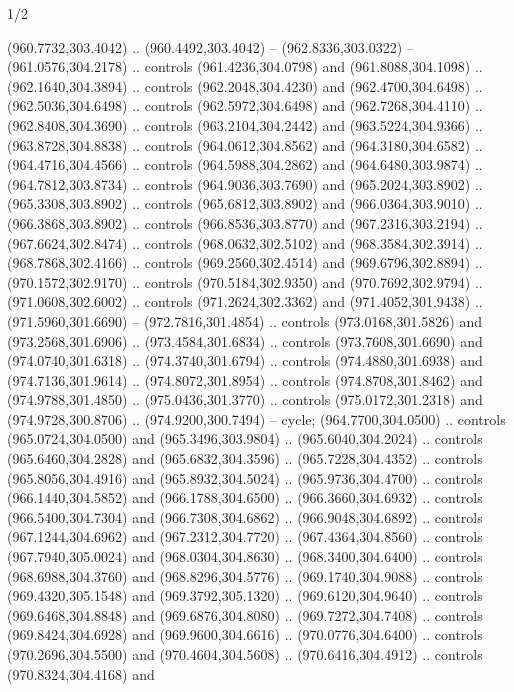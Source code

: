 \begin{flagdescription}{1/2}
\begin{scope}[xshift=0.75\flaglength,yshift=0.5\flagwidth,scale=0.00293\flagwidth]
\begin{scope}[scale=0.675,y=0.80pt, x=0.80pt,yscale=-1,xshift=-720,yshift=-240]
\begin{scope}[miter limit=4.80]
\begin{scope}[draw=black,fill=brown,line width=0.336\lw]
  (960.7732,303.4042) .. (960.4492,303.4042) -- (962.8336,303.0322) --
  (961.0576,304.2178) .. controls (961.4236,304.0798) and (961.8088,304.1098) ..
  (962.1640,304.3894) .. controls (962.2048,304.4230) and (962.4700,304.6498) ..
  (962.5036,304.6498) .. controls (962.5972,304.6498) and (962.7268,304.4110) ..
  (962.8408,304.3690) .. controls (963.2104,304.2442) and (963.5224,304.9366) ..
  (963.8728,304.8838) .. controls (964.0612,304.8562) and (964.3180,304.6582) ..
  (964.4716,304.4566) .. controls (964.5988,304.2862) and (964.6480,303.9874) ..
  (964.7812,303.8734) .. controls (964.9036,303.7690) and (965.2024,303.8902) ..
  (965.3308,303.8902) .. controls (965.6812,303.8902) and (966.0364,303.9010) ..
  (966.3868,303.8902) .. controls (966.8536,303.8770) and (967.2316,303.2194) ..
  (967.6624,302.8474) .. controls (968.0632,302.5102) and (968.3584,302.3914) ..
  (968.7868,302.4166) .. controls (969.2560,302.4514) and (969.6796,302.8894) ..
  (970.1572,302.9170) .. controls (970.5184,302.9350) and (970.7692,302.9794) ..
  (971.0608,302.6002) .. controls (971.2624,302.3362) and (971.4052,301.9438) ..
  (971.5960,301.6690) -- (972.7816,301.4854) .. controls (973.0168,301.5826) and
  (973.2568,301.6906) .. (973.4584,301.6834) .. controls (973.7608,301.6690) and
  (974.0740,301.6318) .. (974.3740,301.6794) .. controls (974.4880,301.6938) and
  (974.7136,301.9614) .. (974.8072,301.8954) .. controls (974.8708,301.8462) and
  (974.9788,301.4850) .. (975.0436,301.3770) .. controls (975.0172,301.2318) and
  (974.9728,300.8706) .. (974.9200,300.7494) -- cycle;
 (964.7700,304.0500) .. controls (965.0724,304.0500) and
  (965.3496,303.9804) .. (965.6040,304.2024) .. controls (965.6460,304.2828) and
  (965.6832,304.3596) .. (965.7228,304.4352) .. controls (965.8056,304.4916) and
  (965.8932,304.5024) .. (965.9736,304.4700) .. controls (966.1440,304.5852) and
  (966.1788,304.6500) .. (966.3660,304.6932) .. controls (966.5400,304.7304) and
  (966.7308,304.6862) .. (966.9048,304.6892) .. controls (967.1244,304.6962) and
  (967.2312,304.7720) .. (967.4364,304.8560) .. controls (967.7940,305.0024) and
  (968.0304,304.8630) .. (968.3400,304.6400) .. controls (968.6988,304.3760) and
  (968.8296,304.5776) .. (969.1740,304.9088) .. controls (969.4320,305.1548) and
  (969.3792,305.1320) .. (969.6120,304.9640) .. controls (969.6468,304.8848) and
  (969.6876,304.8080) .. (969.7272,304.7408) .. controls (969.8424,304.6928) and
  (969.9600,304.6616) .. (970.0776,304.6400) .. controls (970.2696,304.5500) and
  (970.4604,304.5608) .. (970.6416,304.4912) .. controls (970.8324,304.4168) and

\end{scope}
\end{scope}
\end{scope}
\end{scope}
\end{flagdescription}
